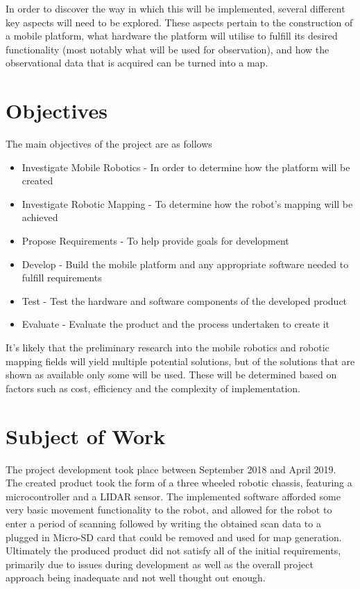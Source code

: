 	In order to discover the way in which this will be implemented, several different key aspects will need to be explored. These aspects pertain to the construction of a mobile platform, what hardware the platform will utilise to fulfill its desired functionality (most notably what will be used for observation), and how the observational data that is acquired can be turned into a map.

	\section{Objectives}
	The main objectives of the project are as follows
	\begin{itemize}
		\item Investigate Mobile Robotics - In order to determine how the platform will be created
		\item Investigate Robotic Mapping - To determine how the robot's mapping will be achieved
		\item Propose Requirements - To help provide goals for development
		\item Develop - Build the mobile platform and any appropriate software needed to fulfill requirements
		\item Test - Test the hardware and software components of the developed product
		\item Evaluate - Evaluate the product and the process undertaken to create it
	\end{itemize}

	It's likely that the preliminary research into the mobile robotics and robotic mapping fields will yield multiple potential solutions, but of the solutions that are shown as available only some will be used. These will be determined based on factors such as cost, efficiency and the complexity of implementation.

	\section{Subject of Work}
	The project development took place between September 2018 and April 2019. The created product took the form of a three wheeled robotic chassis, featuring a microcontroller and a LIDAR sensor. The implemented software afforded some very basic movement functionality to the robot, and allowed for the robot to enter a period of scanning followed by writing the obtained scan data to a plugged in Micro-SD card that could be removed and used for map generation. Ultimately the produced product did not satisfy all of the initial requirements, primarily due to issues during development as well as the overall project approach being inadequate and not well thought out enough.
	
